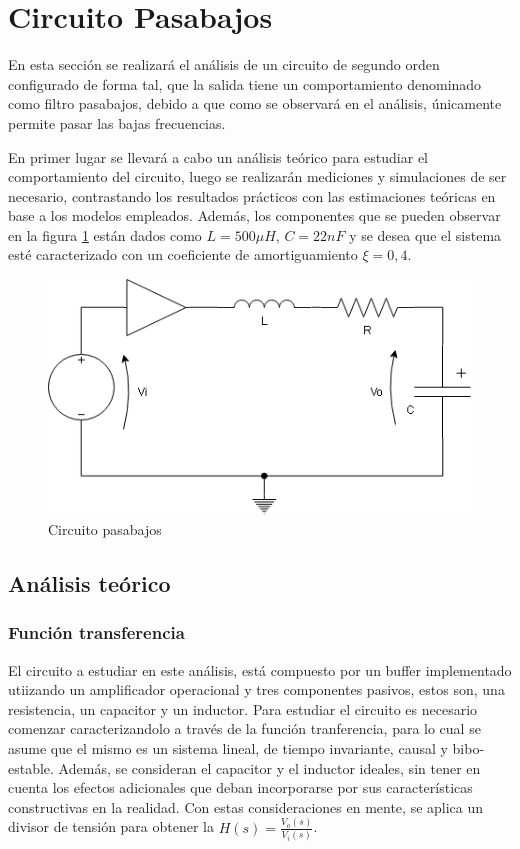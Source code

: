 \section{Circuito Pasabajos}
En esta secci\'on se realizar\'a el an\'alisis de un circuito de segundo orden configurado de forma tal,
que la salida tiene un comportamiento denominado como filtro pasabajos, debido a que como se observar\'a en el an\'alisis,
\'unicamente permite pasar las bajas frecuencias.

En primer lugar se llevar\'a a cabo un an\'alisis te\'orico para estudiar el comportamiento del circuito, luego se realizar\'an mediciones
y simulaciones de ser necesario, contrastando los resultados pr\'acticos con las estimaciones te\'oricas en base a los modelos empleados. Adem\'as,
los componentes que se pueden observar en la figura \ref{fig:circuito_pasabajos} est\'an dados como $L = 500 \mu H$, $C = 22nF$ y se desea que el sistema
est\'e caracterizado con un coeficiente de amortiguamiento $\xi = 0,4$.

\begin{figure}[H]
    \centering
    \includegraphics[scale=0.5]{Recursos/circuito_pasabajos.png}
    \caption{Circuito pasabajos}
    \label{fig:circuito_pasabajos}
\end{figure}

\subsection{An\'alisis te\'orico}

\subsubsection{Funci\'on transferencia}
El circuito a estudiar en este an\'alisis, est\'a compuesto por un buffer implementado utiizando un amplificador operacional y
tres componentes pasivos, estos son, una resistencia, un capacitor y un inductor. Para estudiar el circuito es necesario comenzar caracterizandolo
a trav\'es de la funci\'on tranferencia, para lo cual se asume que el mismo es un sistema lineal, de tiempo invariante, causal y bibo-estable. Adem\'as,
se consideran el capacitor y el inductor ideales, sin tener en cuenta los efectos adicionales que deban incorporarse por sus caracter\'isticas constructivas en
la realidad. Con estas consideraciones en mente, se aplica un divisor de tensi\'on para obtener la $H(s) = \frac{V_o(s)}{V_i(s)}$.

